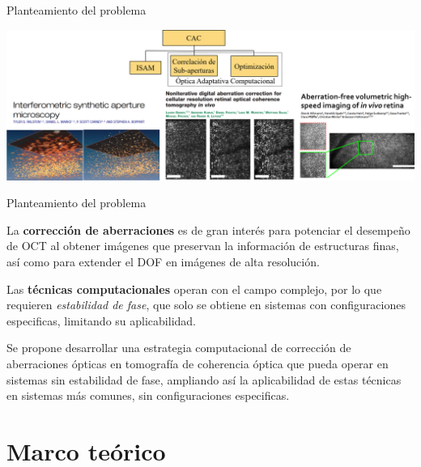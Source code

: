 \documentclass[fleqn,10pt,aspectratio=169,dvipsnames]{beamer}
\begin{document}
\begin{frame}[t]{Planteamiento del problema}
\begin{center}
\begin{overprint}
\includegraphics[height=.55\textheight]{Figuras/ProblemStatement_4.png}
		\end{overprint}
	\end{center}
\end{frame}

\begin{frame}[t]{Planteamiento del problema}
	\begin{center}
{ La \textbf{corrección de aberraciones} es de gran interés para potenciar el desempeño de OCT al obtener imágenes que preservan la información de estructuras finas, así como para extender el DOF en imágenes de alta resolución. \\}

\vspace{\baselineskip}
{Las \textbf{técnicas computacionales} operan con el {\color{blue}campo complejo}, por lo que requieren \textit{estabilidad de fase}, que {\color{red}solo se obtiene en sistemas con configuraciones especificas, limitando su aplicabilidad.} \\}

\vspace{\baselineskip}		
{ Se propone desarrollar una {\color{blue}estrategia computacional de corrección de aberraciones ópticas} en tomografía de coherencia óptica que pueda {\color{blue}operar en sistemas sin estabilidad de fase}, ampliando así la aplicabilidad de estas técnicas en sistemas más comunes, {\color{blue}sin configuraciones especificas.} \\}
	\end{center}
\end{frame}

\section{Marco teórico}
\end{document}
